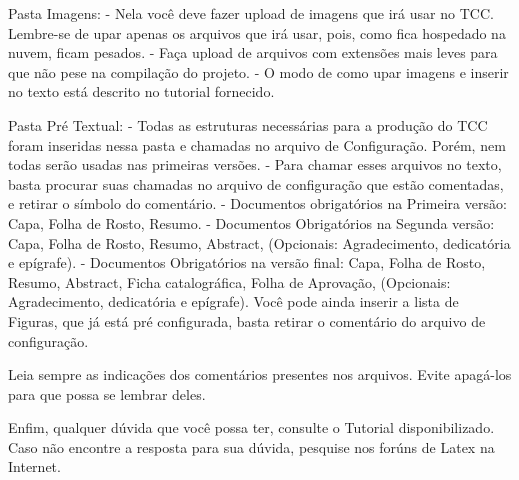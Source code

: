 Pasta Imagens:
- Nela você deve fazer upload de imagens que irá usar no TCC. Lembre-se de upar apenas os arquivos que irá usar, pois, como fica hospedado na nuvem, ficam pesados.
- Faça upload de arquivos com extensões mais leves para que não pese na compilação do projeto.
- O modo de como upar imagens e inserir no texto está descrito no tutorial fornecido.

Pasta Pré Textual:
- Todas as estruturas necessárias para a produção do TCC foram inseridas nessa pasta e chamadas no arquivo de Configuração. Porém, nem todas serão usadas nas primeiras versões.
- Para chamar esses arquivos no texto, basta procurar suas chamadas no arquivo de configuração que estão comentadas, e retirar o símbolo do comentário.
- Documentos obrigatórios na Primeira versão: Capa, Folha de Rosto, Resumo.
- Documentos Obrigatórios na Segunda versão: Capa, Folha de Rosto, Resumo, Abstract, (Opcionais: Agradecimento, dedicatória e epígrafe).
- Documentos Obrigatórios na  versão final: Capa, Folha de Rosto, Resumo, Abstract, Ficha catalográfica, Folha de Aprovação,  (Opcionais: Agradecimento, dedicatória e epígrafe). Você pode ainda inserir a lista de Figuras, que já está pré configurada, basta retirar o comentário do arquivo de configuração.

Leia sempre as indicações dos comentários presentes nos arquivos. Evite apagá-los para que possa se lembrar deles.

Enfim, qualquer dúvida que você possa ter, consulte o Tutorial disponibilizado. Caso não encontre a resposta para sua dúvida, pesquise nos forúns de Latex na Internet.








